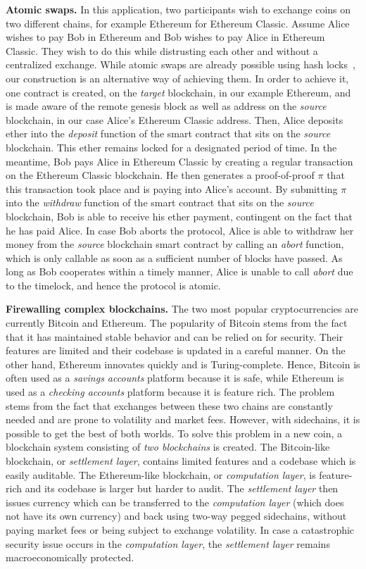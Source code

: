 \noindent
\textbf{Atomic swaps. } In this application, two participants wish to exchange
coins on two different chains, for example Ethereum for Ethereum Classic. Assume
Alice wishes to pay Bob in Ethereum and Bob wishes to pay Alice in Ethereum
Classic. They wish to do this while distrusting each other and without a
centralized exchange. While atomic swaps are already possible using hash
locks~\cite{atomicswaps,herlihy2018atomic}, our construction is an alternative
way of achieving them. In order to achieve it, one contract is created, on the
\emph{target} blockchain, in our example Ethereum, and is made aware of the
remote genesis block as well as address on the \emph{source} blockchain, in our
case Alice's Ethereum Classic address. Then, Alice deposits ether into the
\emph{deposit} function of the smart contract that sits on the \emph{source}
blockchain. This ether remains locked for a designated period of time. In the
meantime, Bob pays Alice in Ethereum Classic by creating a regular transaction
on the Ethereum Classic blockchain. He then generates a proof-of-proof $\pi$
that this transaction took place and is paying into Alice's account. By
submitting $\pi$ into the \emph{withdraw} function of the smart contract that
sits on the \emph{source} blockchain, Bob is able to receive his ether payment,
contingent on the fact that he has paid Alice. In case Bob aborts the protocol,
Alice is able to withdraw her money from the \emph{source} blockchain smart
contract by calling an \emph{abort} function, which is only callable as soon as
a sufficient number of blocks have passed. As long as Bob cooperates within a
timely manner, Alice is unable to call \emph{abort} due to the timelock, and
hence the protocol is atomic.

\noindent
\textbf{Firewalling complex blockchains. } The two most popular cryptocurrencies
are currently Bitcoin and Ethereum. The popularity of Bitcoin stems from the
fact that it has maintained stable behavior and can be relied on for security.
Their features are limited and their codebase is updated in a careful manner. On
the other hand, Ethereum innovates quickly and is Turing-complete. Hence,
Bitcoin is often used as a \emph{savings accounts} platform because it is safe,
while Ethereum is used as a \emph{checking accounts} platform because it is
feature rich. The problem stems from the fact that exchanges between these two
chains are constantly needed and are prone to volatility and market fees.
However, with sidechains, it is possible to get the best of both worlds. To
solve this problem in a new coin, a blockchain system consisting of \emph{two
blockchains} is created. The Bitcoin-like blockchain, or \emph{settlement
layer}, contains limited features and a codebase which is easily auditable. The
Ethereum-like blockchain, or \emph{computation layer}, is feature-rich and its
codebase is larger but harder to audit. The \emph{settlement layer} then issues
currency which can be transferred to the \emph{computation layer} (which does
not have its own currency) and back using two-way pegged sidechains, without
paying market fees or being subject to exchange volatility. In case a
catastrophic security issue occurs in the \emph{computation layer}, the
\emph{settlement layer} remains macroeconomically protected.

